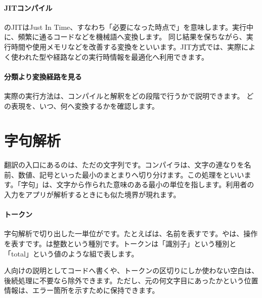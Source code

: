 \par
\endgroup
\medskip
\begingroup
\paragraph{JITコンパイル}
        のJITはJust In Time、すなわち「必要になった時点で」を意味します。実行中に、頻繁に通るコードなどを機械語へ変換します。
        同じ結果を保ちながら、実行時間や使用メモリなどを改善する変換をといいます。JIT方式では、実際によく使われた型や経路などの実行時情報を最適化へ利用できます。

\paragraph{分類より変換経路を見る}
        実際の実行方法は、コンパイルと解釈をどの段階で行うかで説明できます。
        どの表現を、いつ、何へ変換するかを確認します。

\par
\endgroup
\par
\endgroup


\section{字句解析}
\label{sec:02-language-06}

翻訳の入口にあるのは、ただの文字列です。コンパイラは、文字の連なりを名前、数値、記号といった最小のまとまりへ切り分けます。この処理をといいます。「字句」は、文字から作られた意味のある最小の単位を指します。利用者の入力をアプリが解析するときにも似た境界が現れます。

\begingroup
{}\par\medskip
  \centering
  \vspace{6mm}
\begingroup
\paragraph{トークン}
        字句解析で切り出した一単位がです。たとえばは、名前を表すです。\code{=}や\code{*}は、操作を表すです。は整数という種別です。トークンは「識別子」という種別と「total」という値のような組で表します。

        人向けの説明としてコードへ書くや、トークンの区切りにしか使わない空白は、後続処理に不要なら除外できます。ただし、元の何文字目にあったかという位置情報は、エラー箇所を示すために保持できます。

